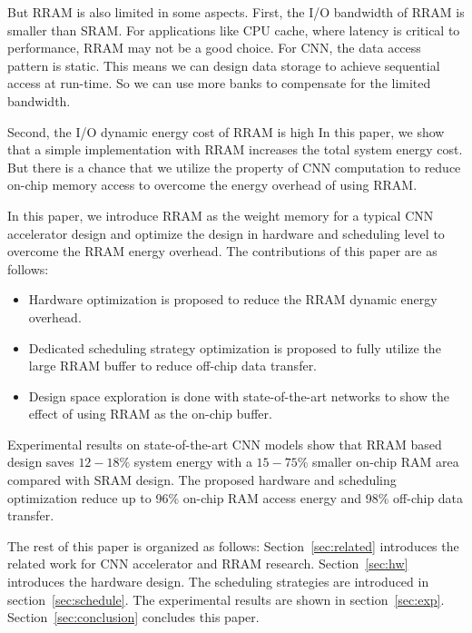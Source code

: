 

But RRAM is also limited in some aspects. First, the I/O bandwidth of RRAM is smaller than SRAM. For applications like CPU cache, where latency is critical to performance, RRAM may not be a good choice. For CNN, the data access pattern is static. This means we can design data storage to achieve sequential access at run-time. So we can use more banks to compensate for the limited bandwidth.

Second, the I/O dynamic energy cost of RRAM is high In this paper, we show that a simple implementation with RRAM increases the total system energy cost. But there is a chance that we utilize the property of CNN computation to reduce on-chip memory access to overcome the energy overhead of using RRAM. 

In this paper, we introduce RRAM as the weight memory for a typical CNN accelerator design and optimize the design in hardware and scheduling level to overcome the RRAM energy overhead. The contributions of this paper are as follows:
\begin{itemize}
\item {Hardware optimization is proposed to reduce the RRAM dynamic energy overhead.}
\item {Dedicated scheduling strategy optimization is proposed to fully utilize the large RRAM buffer to reduce off-chip data transfer.}
\item {Design space exploration is done with state-of-the-art networks to show the effect of using RRAM as the on-chip buffer.}
\end{itemize}

Experimental results on state-of-the-art CNN models show that RRAM based design saves $12-18\%$ system energy with a $15-75\%$ smaller on-chip RAM area compared with SRAM design. The proposed hardware and scheduling optimization reduce up to 96\% on-chip RAM access energy and 98\% off-chip data transfer.

The rest of this paper is organized as follows: Section~\ref{sec:related} introduces the related work for CNN accelerator and RRAM research. Section~\ref{sec:hw} introduces the hardware design. The scheduling strategies are introduced in section~\ref{sec:schedule}. The experimental results are shown in section~\ref{sec:exp}. Section~\ref{sec:conclusion} concludes this paper.